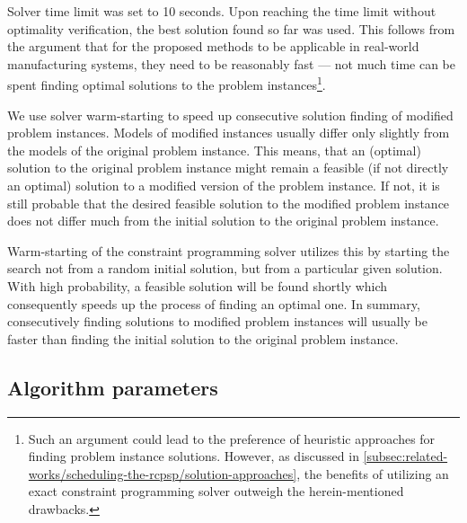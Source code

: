 Solver time limit was set to 10 seconds.
Upon reaching the time limit without optimality verification,
the best solution found so far was used.
This follows from the argument that for the proposed methods
to be applicable in real-world manufacturing systems,
they need to be reasonably fast
--- not much time can be spent finding optimal solutions to the problem instances\footnote{
    Such an argument could lead to the preference of heuristic approaches for finding problem instance solutions.
    However, as discussed in \cref{subsec:related-works/scheduling-the-rcpsp/solution-approaches},
    the benefits of utilizing an exact constraint programming solver outweigh the herein-mentioned drawbacks.
    }.

We use solver warm-starting to speed up consecutive solution finding of modified problem instances.
Models of modified instances usually differ only slightly from the models of the original problem instance.
This means, that an (optimal) solution to the original problem instance
might remain a feasible (if not directly an optimal) solution to a modified version of the problem instance.
If not, it is still probable that the desired feasible solution to the modified problem instance
does not differ much from the initial solution to the original problem instance.

Warm-starting of the constraint programming solver utilizes this
by starting the search not from a random initial solution, but from a particular given solution.
With high probability, a feasible solution will be found shortly
which consequently speeds up the process of finding an optimal one.
In summary, consecutively finding solutions to modified problem instances will usually be faster
than finding the initial solution to the original problem instance.

\subsection{Algorithm parameters} \label{subsec:numerical-experiments/setup/algorithm-parameters}

